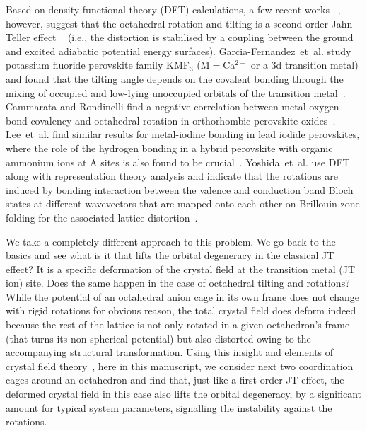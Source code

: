 \documentclass[a4paper,prb,twocolumn]{revtex4-1}  %
\newcommand{\az}[1]{{\color{magenta}{#1}}} %
\begin{document}
Based on density functional theory (DFT) calculations,
a few recent works
~\cite{garcia-fernandezJPCL10,CammarataJCP14,LeeCM16,YoshidaPRL21}, 
however, 
suggest that the octahedral rotation and tilting is 
a second order Jahn-Teller effect
~\cite{HerzbergZPC33,BersukerPL66,KristoffelPSSB67,PearsonJMS83,FultonJCP04,BersukerCR13}
(i.e., the distortion is stabilised by a coupling between the ground and excited adiabatic potential energy surfaces).
Garcia-Fernandez~et~al.
study
potassium fluoride perovskite family KMF$_3$ (M$=$Ca$^{2+}$ or a $3$d transition metal)
and found that the tilting angle
depends on the covalent bonding through the mixing of occupied and 
low-lying unoccupied orbitals of the transition metal~\cite{garcia-fernandezJPCL10}.
Cammarata and Rondinelli
find a negative correlation between metal-oxygen bond covalency 
and octahedral rotation in orthorhombic perovskite oxides~\cite{CammarataJCP14}.
Lee~et~al. find 
similar results for metal-iodine bonding in
lead iodide perovskites,
where the role of 
the hydrogen bonding 
in a hybrid perovskite with
organic ammonium ions at A sites
is also found to be crucial~\cite{LeeCM16}.
Yoshida~et~al.
use DFT along with 
representation theory analysis 
and 
indicate that 
the rotations are induced by bonding interaction 
between the valence and conduction band Bloch states at different wavevectors
that are mapped onto each other on Brillouin zone folding
 for the associated lattice distortion~\cite{YoshidaPRL21}.
 


We take a completely different approach to this problem.
We go back to the basics
and see 
what is it that lifts 
 the orbital degeneracy in the classical JT effect?
It is a specific 
deformation of the crystal field 
at the transition metal (JT ion) site.
Does the same happen in the case of octahedral tilting and rotations?
While the potential of an octahedral anion cage 
in its own frame
does not change 
with
rigid rotations for obvious reason,
the total crystal field 
does deform indeed
because
 the rest of the lattice is not only rotated
  in a given octahedron's frame (that turns its non-spherical potential)
 but also distorted owing to the accompanying structural transformation.
Using this insight
and elements of crystal field theory~\cite{BetheAP29,VanVleckPR32,PavariniChap},
here in this manuscript,
we 
consider next two coordination cages around an octahedron
and find that,
just like a first order JT effect,
 the deformed crystal field 
in this case also lifts the orbital degeneracy,
by a significant amount for typical system parameters,
signalling the instability against the rotations.
\end{document}
